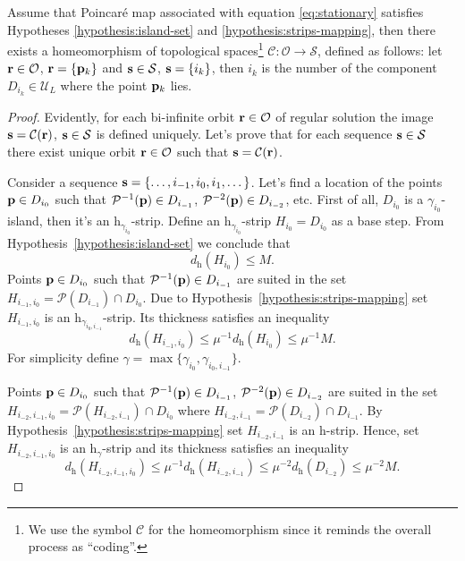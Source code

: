 \begin{theorem}
	Assume that Poincar\'e map associated with equation \eqref{eq:stationary} satisfies Hypotheses \ref{hypothesis:island-set} and \ref{hypothesis:strips-mapping}, then there exists a homeomorphism of topological spaces\footnote{We use the symbol $\mathcal{C}$ for the homeomorphism since it reminds the overall process as ``coding''.} $\mathcal{C}: \mathcal{O} \to \mathcal{S}$, defined as follows: let $\vb{r} \in \mathcal{O}$, $\vb{r} = \{ \vb{p}_k \}$ and $\vb{s} \in \mathcal{S}$, $\vb{s} = \{ i_k \}$, then $i_k$ is the number of the component $D_{i_k} \in \mathscr{U}_L$ where the point $\vb{p}_k$ lies.
\label{thm:coding}
\end{theorem}
\begin{proof}
	Evidently, for each bi-infinite orbit $\vb{r} \in \mathcal{O}$ of regular solution the image $\vb{s} = \mathcal{C}(\vb{r})$, $\vb{s} \in \mathcal{S}$ is defined uniquely.
	Let's prove that for each sequence $\vb{s} \in \mathcal{S}$ there exist unique orbit $\vb{r} \in \mathcal{O}$ such that $\vb{s} = \mathcal{C}(\vb{r})$.
	
	Consider a sequence $\vb{s} = \{ \dots, i_{-1}, i_0, i_1, \dots \}$.
	Let's find a location of the points $\vb{p} \in D_{i_0}$ such that $\mathcal{P}^{-1}(\vb{p}) \in D_{i_{-1}}$, $\mathcal{P}^{-2}(\vb{p}) \in D_{i_{-2}}$, etc.
	First of all, $D_{i_0}$ is a $\gamma_{i_0}$-island, then it's an $\mathrm{h}_{\gamma_{i_0}}$-strip.
	Define an $\mathrm{h}_{\gamma_{i_0}}$-strip $H_{i_0} = D_{i_0}$ as a base step.
	From Hypothesis~\ref{hypothesis:island-set} we conclude that
		\begin{equation}
		d_{\mathrm{h}}(H_{i_0}) \le M.
	\end{equation}
	Points $\vb{p} \in D_{i_0}$ such that $\mathcal{P}^{-1}(\vb{p}) \in D_{i_{-1}}$ are suited in the set $H_{i_{-1}, i_0} = \mathcal{P}(D_{i_{-1}}) \cap D_{i_0}$.
	Due to Hypothesis~\ref{hypothesis:strips-mapping} set $H_{i_{-1}, i_0}$ is an $\mathrm{h}_{\gamma_{i_0, i_{-1}}}$-strip.
	Its thickness satisfies an inequality
	\begin{equation}
		d_{\mathrm{h}}(H_{i_{-1}, i_0}) \le \mu^{-1} d_{\mathrm{h}}(H_{i_0}) \le \mu^{-1} M.
	\end{equation}
	For simplicity define $\gamma = \max \{ \gamma_{i_0}, \gamma_{i_0, i_{-1}} \}$.
	
	Points $\vb{p} \in D_{i_0}$ such that $\mathcal{P}^{-1}(\vb{p}) \in D_{i_{-1}}$, $\mathcal{P}^{-2}(\vb{p}) \in D_{i_{-2}}$ are suited in the set $H_{i_{-2}, i_{-1}, i_0} = \mathcal{P}(H_{i_{-2}, i_{-1}}) \cap D_{i_0}$ where $H_{i_{-2}, i_{-1}} = \mathcal{P}(D_{i_{-2}}) \cap D_{i_{-1}}$.
	By Hypothesis~\ref{hypothesis:strips-mapping} set $H_{i_{-2}, i_{-1}}$ is an h-strip.
	Hence, set $H_{i_{-2}, i_{-1}, i_0}$ is an $\mathrm{h}_{\gamma}$-strip and its thickness satisfies an inequality
	\begin{equation}
		d_{\mathrm{h}}(H_{i_{-2}, i_{-1}, i_0}) \le \mu^{-1} d_{\mathrm{h}}(H_{i_{-2}, i_{-1}}) \le \mu^{-2} d_{\mathrm{h}}(D_{i_{-2}}) \le \mu^{-2} M.
	\end{equation}
	

\end{proof}
